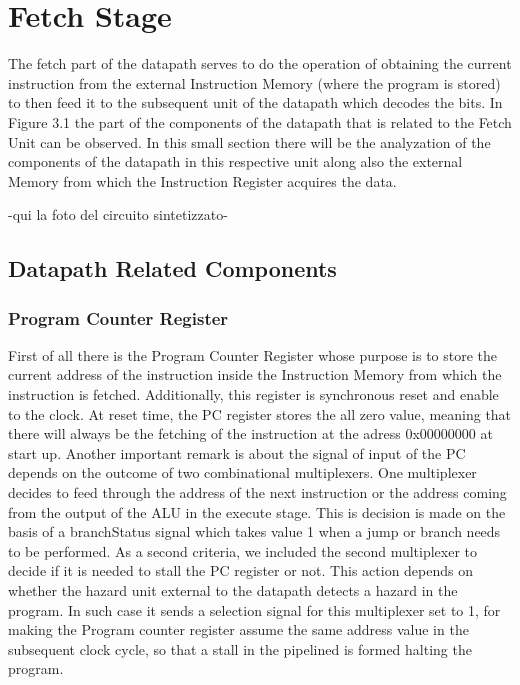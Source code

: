 %
\chapter{Fetch Stage}
\label{FetchUnit}

The fetch part of the datapath serves to do the operation of obtaining the current instruction
from the external Instruction Memory (where the program is stored) to then feed it to the subsequent unit of the datapath which decodes the bits.
In Figure 3.1 the part of the components of the datapath that is related to the Fetch Unit can be observed.
In this small section there will be the analyzation of the components of the datapath in this respective unit along also the external Memory from which the Instruction Register acquires the data.


-qui la foto del circuito sintetizzato-


\section{Datapath Related Components}

\subsection{ Program Counter Register }
First of all there is the Program Counter Register whose purpose is to store the current address of the instruction inside the Instruction Memory from
which the instruction is fetched. Additionally, this register is synchronous reset and enable to the clock. At reset time, the PC register stores the 
all zero value, meaning that there will always be the fetching of the instruction at the adress 0x00000000 at start up. 
Another important remark is about the signal of input of the PC depends on the outcome of two combinational multiplexers. One multiplexer decides to
feed through the address of the next instruction or the address coming from the output of the ALU in the execute stage. This is decision is made on the basis
of a branchStatus signal which takes value 1 when a jump or branch needs to be performed.
As a second criteria, we included the second multiplexer to decide if it is needed to stall the PC register or not. This action depends on whether the hazard unit
external to the datapath detects a hazard in the program. In such case it sends a selection signal for this multiplexer set to 1, for making the Program 
counter register assume the same address value in the subsequent clock cycle, so that a stall in the pipelined is formed halting the program.

